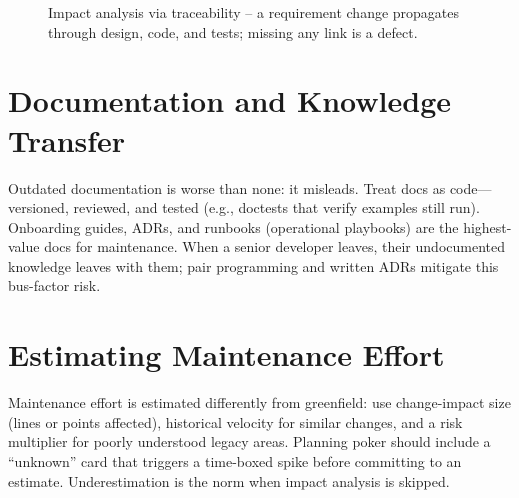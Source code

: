\begin{figure}[h]
\centering
{}
\caption{Impact analysis via traceability -- a requirement change propagates through design, code, and tests; missing any link is a defect.}
\end{figure}


\section{Documentation and Knowledge Transfer}

Outdated documentation is worse than none: it misleads. Treat docs as code---versioned, reviewed, and tested (e.g., doctests that verify examples still run). Onboarding guides, ADRs, and runbooks (operational playbooks) are the highest-value docs for maintenance. When a senior developer leaves, their undocumented knowledge leaves with them; pair programming and written ADRs mitigate this bus-factor risk.


\section{Estimating Maintenance Effort}

Maintenance effort is estimated differently from greenfield: use change-impact size (lines or points affected), historical velocity for similar changes, and a risk multiplier for poorly understood legacy areas. Planning poker should include a ``unknown'' card that triggers a time-boxed spike before committing to an estimate. Underestimation is the norm when impact analysis is skipped.

